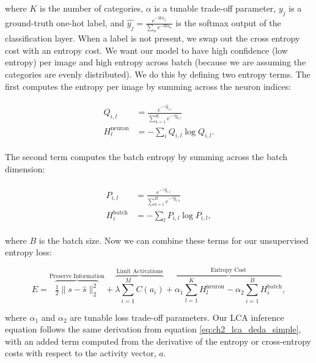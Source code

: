 \noindent where $K$ is the number of categories, $\alpha$ is a tunable trade-off parameter, $y_{j}$ is a ground-truth one-hot label, and $\hat{y_{j}} = \frac{e^{-Wa_{j}}}{\sum_{n}e^{-Wa_{n}}}$ is the softmax output of the classification layer. When a label is not present, we swap out the cross entropy cost with an entropy cost. We want our model to have high confidence (low entropy) per image and high entropy across batch (because we are assuming the categories are evenly distributed). We do this by defining two entropy terms. The first computes the entropy per image by summing across the neuron indices:

\begin{align}\label{eq:ch3_lcaf_q_dist}
\begin{split}
  Q_{i,l} &= \frac{e^{-\gamma \hat{y}_{i,l}}}{\sum\limits_{k=1}^{K}e^{-\gamma \hat{y}_{k,l}}} \\
  H^{\text{neuron}}_{l} &= -\sum_{i}Q_{i,l}\log Q_{i,l}.
 \end{split}
\end{align}

The second term computes the batch entropy by summing across the batch dimension:

\begin{align}\label{eq:ch3_lcaf_p_dist}
\begin{split}
  P_{i,l} &= \frac{e^{-\gamma \hat{y}_{i,l}}}{\sum\limits_{b=1}^{B} e^{-\gamma \hat{y}_{i,b}}} \\
  H^{\text{batch}}_{i} &= -\sum_{l}P_{i,l}\log P_{i,l},
 \end{split}
\end{align}

\noindent where $B$ is the batch size. Now we can combine these terms for our unsupervised entropy loss:

\begin{equation}\label{eq:ch3_lcaf_unsupervised_energy}
         E =
        \overbrace{ \tfrac{1}{2} \| s - \hat{s} \|_{2}^{2} }^\text{Preserve Information} +
        \overbrace{ \lambda \sum\limits_{i=1}^{M}C(a_{i}) }^\text{Limit Activations} +
        \overbrace{ \alpha_{1} \sum\limits_{l=1}^{K} H^{\text{neuron}}_{l} - \alpha_{2} \sum\limits_{i=1}^{B}H^{\text{batch}}_{i}}^\text{Entropy Cost},
\end{equation}

\noindent where $\alpha_{1}$ and $\alpha_{2}$ are tunable loss trade-off parameters. Our LCA inference equation follows the same derivation from equation \ref{eq:ch2_lca_deda_simple}, with an added term computed from the derivative of the entropy or cross-entropy costs with respect to the activity vector, $a$.

